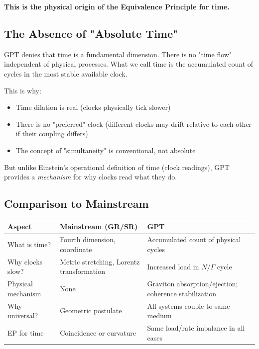 \documentclass[12pt, a4paper]{article}
\begin{document}
\textbf{This is the physical origin of the Equivalence Principle for time.}

\subsection{The Absence of "Absolute Time"}
\label{subsec:no_absolute_time}

GPT denies that time is a fundamental dimension. There is no "time flow" independent of physical processes. What we call time is the accumulated count of cycles in the most stable available clock.

This is why:
\begin{itemize}
    \item Time dilation is real (clocks physically tick slower)
    \item There is no "preferred" clock (different clocks may drift relative to each other if their coupling differs)
    \item The concept of "simultaneity" is conventional, not absolute
\end{itemize}

But unlike Einstein's operational definition of time (clock readings), GPT provides a \textit{mechanism} for why clocks read what they do.

\subsection{Comparison to Mainstream}
\label{subsec:time_comparison}

\begin{center}
\begin{tabular}{|p{3.5cm}|p{5cm}|p{5cm}|}
\hline
\textbf{Aspect} & \textbf{Mainstream (GR/SR)} & \textbf{GPT} \\
\hline
What is time? & Fourth dimension, coordinate & Accumulated count of physical cycles \\
\hline
Why clocks slow? & Metric stretching, Lorentz transformation & Increased load in \( N/\Gamma \) cycle \\
\hline
Physical mechanism & None & Graviton absorption/ejection; coherence stabilization \\
\hline
Why universal? & Geometric postulate & All systems couple to same medium \\
\hline
EP for time & Coincidence or curvature & Same load/rate imbalance in all cases \\
\hline
\end{tabular}
\end{center}
\end{document}
